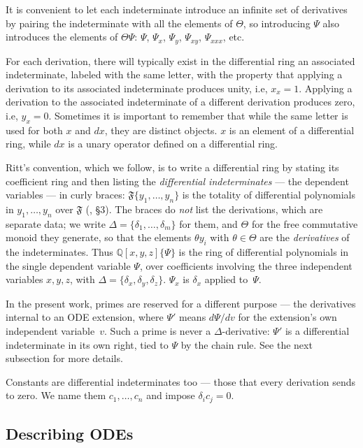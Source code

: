 \documentclass{article}
\theoremstyle{definition}
\theoremstyle{plain}
\begin{document}
It is convenient to
let each indeterminate introduce an infinite set of derivatives by pairing
the indeterminate with all the elements of $\Theta$, so introducing $\Psi$
also introduces the elements of $\Theta\Psi$: $\Psi$, $\Psi_x$, $\Psi_y$, $\Psi_{xy}$, $\Psi_{xxx}$, etc.

For each derivation, there will typically exist in the differential ring an associated indeterminate,
labeled with the same letter,
with the property that applying a derivation to its
associated indeterminate produces unity, i.e, $x_x = 1$.  Applying a derivation to
the associated indeterminate of a different derivation produces zero, i.e, $y_x = 0$.
Sometimes it is important to remember that while the same letter is used for both
$x$ and $dx$, they are distinct objects. $x$ is an element of a differential
ring, while $dx$ is a unary operator defined on a differential ring.

Ritt's convention, which we follow, is to write a differential ring by stating
its coefficient ring and then listing the {\it differential indeterminates} ---
the dependent variables --- in curly braces: $\mathfrak{F}\{y_1, \ldots, y_n\}$
is the totality of differential polynomials in $y_1, \ldots, y_n$ over
$\mathfrak{F}$ (\cite{Ritt}, \S3).  The braces do {\it not} list the derivations,
which are separate data; we write $\Delta = \{\delta_1, \ldots, \delta_m\}$ for
them, and $\Theta$ for the free commutative monoid they generate, so that the
elements $\theta y_i$ with $\theta \in \Theta$ are the {\it derivatives} of the
indeterminates.
Thus $\mathbb{Q}[x,y,z]\{\Psi\}$ is the ring of differential polynomials in the single
dependent variable $\Psi$, over coefficients involving the three independent
variables $x,y,z$, with $\Delta = \{\delta_x, \delta_y, \delta_z\}$.
$\Psi_x$ is $\delta_x$ applied to~$\Psi$.

In the present work, primes are reserved for a different purpose --- the derivatives
internal to an ODE extension,
where $\Psi'$ means $d\Psi/dv$ for the extension's
own independent variable~$v$.  Such a prime is never a $\Delta$-derivative:
$\Psi'$ is a differential indeterminate in its own right, tied to $\Psi$ by the
chain rule.  See the next subsection for more details.

Constants are differential indeterminates too --- those that every derivation
sends to zero.  We name them $c_1, \ldots, c_n$ and impose $\delta_i c_j = 0$.

\subsection{Describing ODEs}
\end{document}
